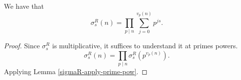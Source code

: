 \begin{theorem}
\label{sigmaR_eq_prod_primeFactors_sum_range_factorization_pow_mul}
\leanok
We have that
    $$\sigma^R_s(n)=\prod_{p\mid n}\sum_{j=0}^{v_p(n)}p^{js}.$$
\end{theorem}
\begin{proof}
\leanok
Since $\sigma^R_s$ is multiplicative, it suffices to understand it at primes powers.
    $$\sigma^R_s(n)=\prod_{p\mid n}\sigma^R_s(p^{v_p(n)}).$$
    Applying Lemma \ref{sigmaR-apply-prime-pow}.
\end{proof}

